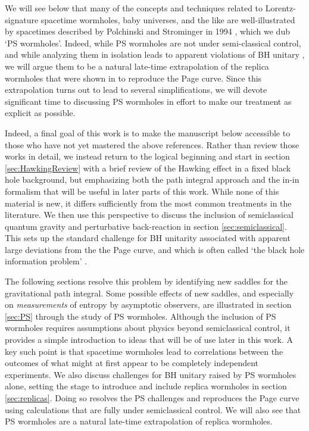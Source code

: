 \documentclass[letterpaper,12pt]{article}
\begin{document}
We will see below that many of the concepts and techniques related to Lorentz-signature spacetime wormholes, baby universes, and the like are well-illustrated by spacetimes described by Polchinski and Strominger in 1994 \cite{Polchinski:1994zs}, which we dub `PS wormholes'.  Indeed, while PS wormholes are not under semi-classical control, and while analyzing them in isolation leads to apparent violations of BH unitary \cite{Polchinski:1994zs}, we will argue them to be a natural late-time extrapolation of the replica wormholes that were shown in \cite{Penington:2019kki,Almheiri:2019qdq} to reproduce the Page curve.  Since this extrapolation turns out to lead to several simplifications, we will devote significant time to discussing PS wormholes in effort to make our treatment as explicit as possible.

Indeed, a final goal of this work is to make the manuscript below accessible to those who have not yet mastered the above references.  Rather than review those works in detail, we instead return to the logical beginning and start in section \ref{sec:HawkingReview} with a brief review of the Hawking effect in a fixed black hole background, but emphasizing both the path integral approach and the in-in formalism that will be useful in later parts of this work.  While none of this material is new, it differs sufficiently from the most common treatments in the literature.  We then use this perspective to discuss the inclusion of semiclassical quantum gravity and perturbative back-reaction in section \ref{sec:semiclassical}.  This sets up the standard challenge for BH unitarity associated with apparent large deviations from the the Page curve, and which is often called `the black hole information problem' \cite{Mathur:2009hf,Harlow:2014yka,Unruh:2017uaw,Marolf:2017jkr}.

The following sections resolve this problem by identifying new saddles for the gravitational path integral.  Some possible effects of new saddles, and especially on \emph{measurements} of entropy by asymptotic observers, are illustrated in section \ref{sec:PS} through the study of PS wormholes.   Although the inclusion of PS wormholes requires assumptions about physics beyond semiclassical control, it provides a simple introduction to ideas that will be of use later in this work.  A key such point is that spacetime wormholes lead to correlations between the outcomes of what might at first appear to be completely independent experiments.  We also discuss challenges for BH unitary raised by PS wormholes alone, setting the stage to introduce and include replica wormholes in section \ref{sec:replicas}.  Doing so resolves the PS challenges and reproduces the Page curve using calculations that are fully under semiclassical control.  We will also see that PS wormholes are a natural late-time extrapolation of replica wormholes.
\end{document}

